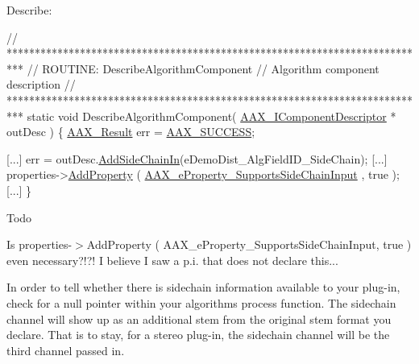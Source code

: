 Describe\+: 
\begin{DoxyCode}
\textcolor{comment}{// ***************************************************************************}
\textcolor{comment}{// ROUTINE: DescribeAlgorithmComponent}
\textcolor{comment}{// Algorithm component description}
\textcolor{comment}{// ***************************************************************************}
\textcolor{keyword}{static} \textcolor{keywordtype}{void} DescribeAlgorithmComponent( \hyperlink{a00088}{AAX\_IComponentDescriptor} * outDesc )
\{
    \hyperlink{a00149_a4d8f69a697df7f70c3a8e9b8ee130d2f}{AAX\_Result}                    err = \hyperlink{a00207_a5f8c7439f3a706c4f8315a9609811937aeddbd1bb67e3a66e6af54a4b4a7a57b3}{AAX\_SUCCESS};

    [...]
    err = outDesc.\hyperlink{a00088_a1e0c9508d1eb0c9a60a87a0fb69f1dbe}{AddSideChainIn}(eDemoDist\_AlgFieldID\_SideChain);
    [...]
    properties->\hyperlink{a00112_a0997671afce9a2367662c764c1d055dd}{AddProperty} ( \hyperlink{a00283_a6571f4e41a5dd06e4067249228e2249ea3399fcd8ff459de1e3de0c98d40a5094}{AAX\_eProperty\_SupportsSideChainInput}
      , \textcolor{keyword}{true} );
    [...]
\}
\end{DoxyCode}


\begin{DoxyRefDesc}{Todo}
\item[\hyperlink{a00382__todo000001}{Todo}]Is properties-\/$>$Add\+Property ( A\+A\+X\+\_\+e\+Property\+\_\+\+Supports\+Side\+Chain\+Input, true ) even necessary?!?! I believe I saw a p.\+i. that does not declare this...\end{DoxyRefDesc}


In order to tell whether there is sidechain information available to your plug-\/in, check for a null pointer within your algorithm\textquotesingle{}s process function. The sidechain channel will show up as an additional stem from the original stem format you declare. That is to stay, for a stereo plug-\/in, the sidechain channel will be the third channel passed in.


